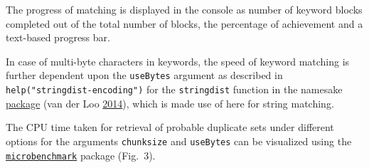 \documentclass[
]{article}
\begin{document}
The progress of matching is displayed in the console as number of
keyword blocks completed out of the total number of blocks, the
percentage of achievement and a text-based progress bar.

In case of multi-byte characters in keywords, the speed of keyword
matching is further dependent upon the \texttt{useBytes} argument as
described in \texttt{help("stringdist-encoding")} for the
\texttt{stringdist} function in the namesake
\href{https://CRAN.R-project.org/package=stringdist}{package} (van der
Loo \protect\hyperlink{ref-van2014stringdist}{2014}), which is made use
of here for string matching.

The CPU time taken for retrieval of probable duplicate sets under
different options for the arguments \texttt{chunksize} and
\texttt{useBytes} can be visualized using the
\href{https://CRAN.R-project.org/package=microbenchmark}{\texttt{microbenchmark}}
package (Fig.~3).
\end{document}
